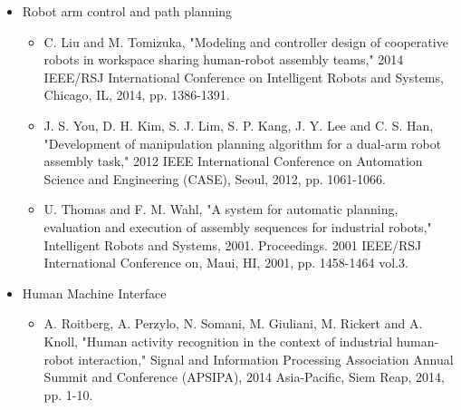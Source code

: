 \begin{frame}{}
	\begin{itemize}
		\item Robot arm control and path planning
		\begin{itemize}
			\begingroup
			\scriptsize
			\item C. Liu and M. Tomizuka, "Modeling and controller design of cooperative robots in workspace sharing human-robot assembly teams," 2014 IEEE/RSJ International Conference on Intelligent Robots and Systems, Chicago, IL, 2014, pp. 1386-1391.
			\item J. S. You, D. H. Kim, S. J. Lim, S. P. Kang, J. Y. Lee and C. S. Han, "Development of manipulation planning algorithm for a dual-arm robot assembly task," 2012 IEEE International Conference on Automation Science and Engineering (CASE), Seoul, 2012, pp. 1061-1066.
			\item U. Thomas and F. M. Wahl, "A system for automatic planning, evaluation and execution of assembly sequences for industrial robots," Intelligent Robots and Systems, 2001. Proceedings. 2001 IEEE/RSJ International Conference on, Maui, HI, 2001, pp. 1458-1464 vol.3.
			\endgroup
		\end{itemize}
		
		\item Human Machine Interface
		\begin{itemize}
			\begingroup
			\scriptsize
			\item A. Roitberg, A. Perzylo, N. Somani, M. Giuliani, M. Rickert and A. Knoll, "Human activity recognition in the context of industrial human-robot interaction," Signal and Information Processing Association Annual Summit and Conference (APSIPA), 2014 Asia-Pacific, Siem Reap, 2014, pp. 1-10.
			\endgroup
		\end{itemize}
	\end{itemize}
\end{frame}

